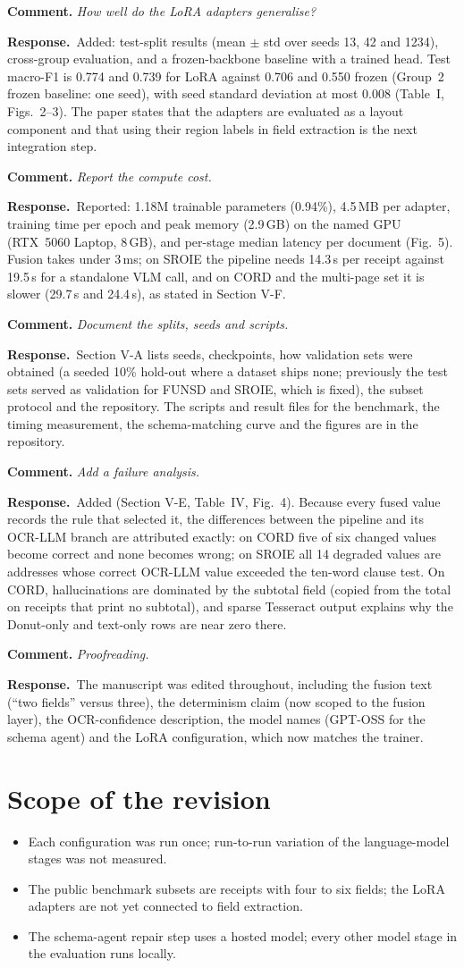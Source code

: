 \documentclass[11pt]{article}
\newcommand{\rc}[1]{\par\medskip\textbf{Comment.} \emph{#1}\par}
\newcommand{\rr}{\textbf{Response.}\ }
\begin{document}
\rc{How well do the LoRA adapters generalise?}
\rr Added: test-split results (mean $\pm$ std over seeds 13, 42 and 1234), cross-group evaluation, and a frozen-backbone baseline with a trained head. Test macro-F1 is 0.774 and 0.739 for LoRA against 0.706 and 0.550 frozen (Group~2 frozen baseline: one seed), with seed standard deviation at most 0.008 (Table~I, Figs.~2--3). The paper states that the adapters are evaluated as a layout component and that using their region labels in field extraction is the next integration step.

\rc{Report the compute cost.}
\rr Reported: 1.18M trainable parameters (0.94\%), 4.5\,MB per adapter, training time per epoch and peak memory (2.9\,GB) on the named GPU (RTX~5060 Laptop, 8\,GB), and per-stage median latency per document (Fig.~5). Fusion takes under 3\,ms; on SROIE the pipeline needs 14.3\,s per receipt against 19.5\,s for a standalone VLM call, and on CORD and the multi-page set it is slower (29.7\,s and 24.4\,s), as stated in Section V-F.

\rc{Document the splits, seeds and scripts.}
\rr Section V-A lists seeds, checkpoints, how validation sets were obtained (a seeded 10\% hold-out where a dataset ships none; previously the test sets served as validation for FUNSD and SROIE, which is fixed), the subset protocol and the repository. The scripts and result files for the benchmark, the timing measurement, the schema-matching curve and the figures are in the repository.

\rc{Add a failure analysis.}
\rr Added (Section V-E, Table~IV, Fig.~4). Because every fused value records the rule that selected it, the differences between the pipeline and its OCR-LLM branch are attributed exactly: on CORD five of six changed values become correct and none becomes wrong; on SROIE all 14 degraded values are addresses whose correct OCR-LLM value exceeded the ten-word clause test. On CORD, hallucinations are dominated by the subtotal field (copied from the total on receipts that print no subtotal), and sparse Tesseract output explains why the Donut-only and text-only rows are near zero there.

\rc{Proofreading.}
\rr The manuscript was edited throughout, including the fusion text (``two fields'' versus three), the determinism claim (now scoped to the fusion layer), the OCR-confidence description, the model names (GPT-OSS for the schema agent) and the LoRA configuration, which now matches the trainer.

\section*{Scope of the revision}
\begin{itemize}[leftmargin=*,nosep]
\item Each configuration was run once; run-to-run variation of the language-model stages was not measured.
\item The public benchmark subsets are receipts with four to six fields; the LoRA adapters are not yet connected to field extraction.
\item The schema-agent repair step uses a hosted model; every other model stage in the evaluation runs locally.
\end{itemize}
\end{document}
